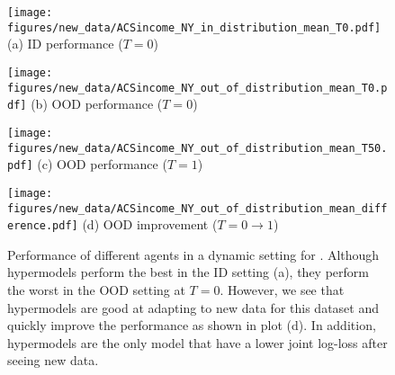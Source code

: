 \begin{figure}[h]
\centering
\begin{minipage}[b]{0.24\textwidth}
\centering
\texttt{[image: figures/new\_data/ACSincome\_NY\_in\_distribution\_mean\_T0.pdf]}
{\small{{(a)} ID performance ($T=0$) }}
\end{minipage}
\hfill
\begin{minipage}[b]{0.24\textwidth}
\centering \texttt{[image: figures/new\_data/ACSincome\_NY\_out\_of\_distribution\_mean\_T0.pdf]}
{\small{{(b)} OOD performance ($T=0$) }}
\end{minipage}
\hfill
\begin{minipage}[b]{0.24\textwidth}
\centering \texttt{[image: figures/new\_data/ACSincome\_NY\_out\_of\_distribution\_mean\_T50.pdf]}
{\small{{(c)} OOD performance ($T=1$) }}
\end{minipage}
\hfill
\begin{minipage}[b]{0.24\textwidth}
\centering \texttt{[image: figures/new\_data/ACSincome\_NY\_out\_of\_distribution\_mean\_difference.pdf]}
{\small{{(d)} OOD improvement ($T=0 \to 1$) }}
\end{minipage}
\caption{Performance of different agents in a dynamic setting for \acsincome.
Although hypermodels perform the best in the ID setting (a), they perform the worst in the OOD setting at $T=0$. However, we see that hypermodels are good at adapting to new data for this dataset and quickly improve the performance as shown in plot (d). In addition, hypermodels are the only model that have a lower joint log-loss after seeing new data.
}
\label{fig:dynamic_setting_ACSincome_NY_}
\end{figure}


